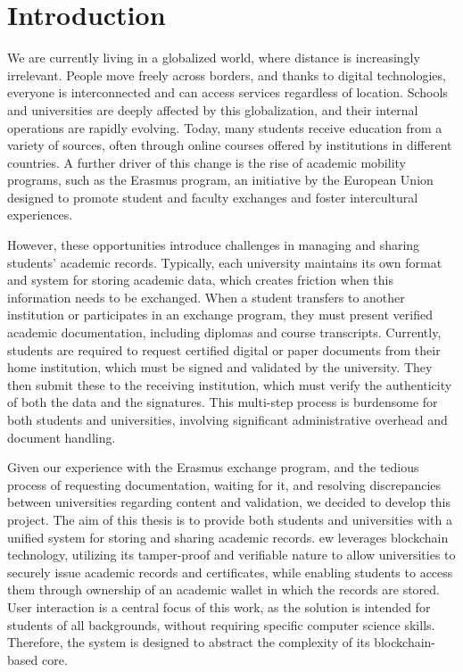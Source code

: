 \chapter{Introduction}
We are currently living in a globalized world, where distance is increasingly irrelevant. People move freely across borders, and thanks to digital technologies, everyone is interconnected and can access services regardless of location. Schools and universities are deeply affected by this globalization, and their internal operations are rapidly evolving. Today, many students receive education from a variety of sources, often through online courses offered by institutions in different countries. 
A further driver of this change is the rise of academic mobility programs, such as the Erasmus program, an initiative by the European Union designed to promote student and faculty exchanges and foster intercultural experiences.

However, these opportunities introduce challenges in managing and sharing students' academic records. Typically, each university maintains its own format and system for storing academic data, which creates friction when this information needs to be exchanged. When a student transfers to another institution or participates in an exchange program, they must present verified academic documentation, including diplomas and course transcripts. Currently, students are required to request certified digital or paper documents from their home institution, which must be signed and validated by the university. They then submit these to the receiving institution, which must verify the authenticity of both the data and the signatures. This multi-step process is burdensome for both students and universities, involving significant administrative overhead and document handling.

Given our experience with the Erasmus exchange program, and the tedious process of requesting documentation, waiting for it, and resolving discrepancies between universities regarding content and validation, we decided to develop this project. The aim of this thesis is to provide both students and universities with a unified system for storing and sharing academic records. \acrfull{ew} leverages blockchain technology, utilizing its tamper-proof and verifiable nature to allow universities to securely issue academic records and certificates, while enabling students to access them through ownership of an academic wallet in which the records are stored. User interaction is a central focus of this work, as the solution is intended for students of all backgrounds, without requiring specific computer science skills. Therefore, the system is designed to abstract the complexity of its blockchain-based core.

